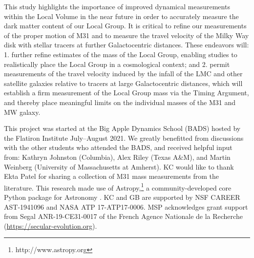 \documentclass[twocolumn]{aastex631}
\begin{document}
This study highlights the importance of improved dynamical measurements within
the Local Volume in the near future in order to accurately measure the dark
matter content of our Local Group.
It is critical to refine our measurements of the proper motion of M31 and to
measure the travel velocity of the Milky Way disk with stellar tracers at
further Galactocentric distances.
These endeavors will: 1. further refine estimates of the mass of the Local
Group, enabling studies to realistically place the Local Group in a cosmological
context; and 2. permit measurements of the travel velocity induced by the infall
of the LMC and other satellite galaxies relative to tracers at large
Galactocentric distances, which will establish a firm measurement of the Local
Group mass via the Timing Argument, and thereby place meaningful limits on the
individual masses of the M31 and MW galaxy.


\begin{acknowledgements}

This project was started at the Big Apple Dynamics School (BADS) hosted by the
Flatiron Institute July--August 2021.
We greatly benefitted from discussions with the other students who attended the
BADS, and received helpful input from:
Kathryn Johnston (Columbia), Alex Riley (Texas A\&M), and Martin Weinberg 
(University of Massachusetts at Amherst).
KC would like to thank Ekta Patel for sharing a collection of M31 mass
measurements from the literature.
This research made use of Astropy,\footnote{http://www.astropy.org} a
community-developed core Python package for Astronomy \citep{astropy:2013,
astropy:2018}.
KC and GB are supported by NSF CAREER AST-1941096 and NASA ATP 17-ATP17-0006.
MSP acknowledges grant support from Segal ANR-19-CE31-0017 of the French Agence
Nationale de la Recherche (\url{https://secular-evolution.org}).

\end{acknowledgements}

\end{document}
